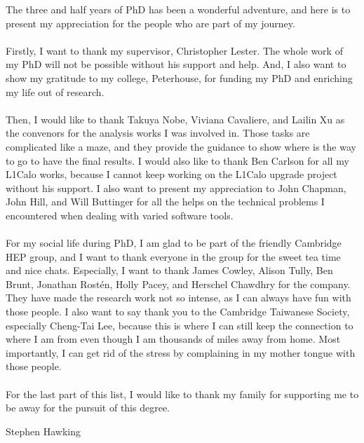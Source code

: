 \begin{acknowledgements}
\noindent
The three and half years of PhD has been a wonderful adventure, and here is to present my appreciation for the people who are part of my journey.
\\
\\Firstly, I want to thank my supervisor, Christopher Lester. The whole work of my PhD will not be possible without his support and help. And, I also want to show my gratitude to my college, Peterhouse, for funding my PhD and enriching my life out of research. 
\\
\\Then, I would like to thank Takuya Nobe, Viviana Cavaliere, and Lailin Xu as the convenors for the analysis works I was involved in. Those tasks are complicated like a maze, and they provide the guidance to show where is the way to go to have the final results. I would also like to thank Ben Carlson for all my L1Calo works, because I cannot keep working on the L1Calo upgrade project without his support.  I also want to present my appreciation to John Chapman, John Hill, and Will Buttinger for all the helps on the technical problems I encountered when dealing with varied software tools.
\\
\\For my social life during PhD, I am glad to be part of the friendly Cambridge HEP group, and I want to thank everyone in the group for the sweet tea time and nice chats. Especially, I want to thank James Cowley, Alison Tully, Ben Brunt, Jonathan Rostén, Holly Pacey, and Herschel Chawdhry for the company. They have made the research work not so intense, as I can always have fun with those people. I also want to say thank you to the Cambridge Taiwanese Society, especially Cheng-Tai Lee, because this is where I can still keep the connection to where I am from even though I am thousands of miles away from home. Most importantly, I can get rid of the stress by complaining in my mother tongue with those people.
\\
\\For the last part of this list, I would like to thank my family for supporting me to be away for the pursuit of this degree. 

\end{acknowledgements}



\tableofcontents


%
  {Stephen Hawking}
\thispagestyle{empty}
